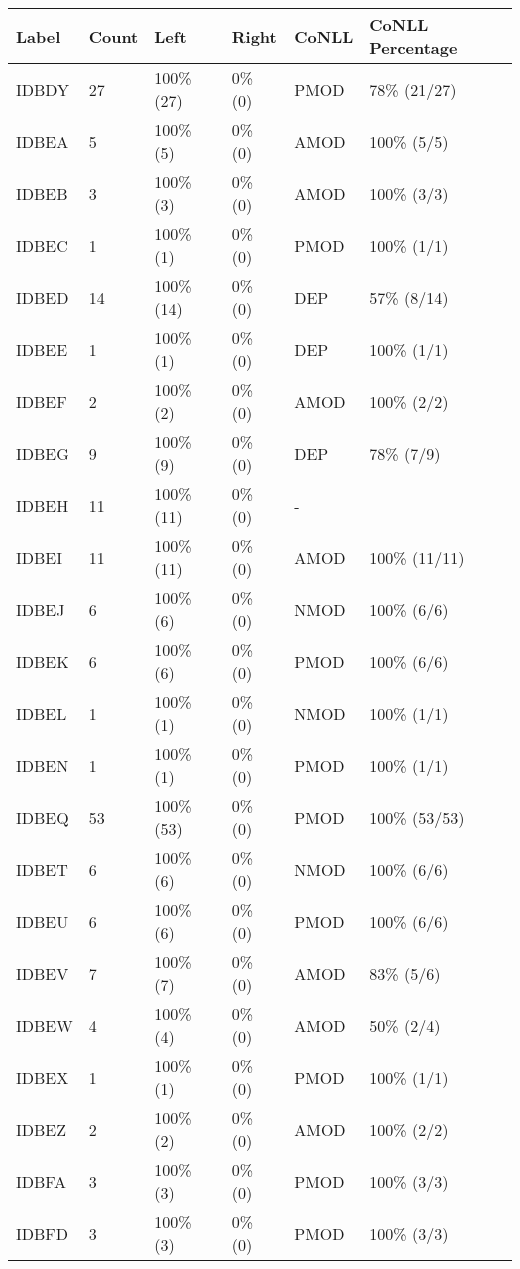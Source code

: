 \begin{figure*}
\begin{tabular}{|l|l|l|l||l|l|}
\hline
Label & Count & Left & Right & CoNLL & CoNLL Percentage\\ 
\hline
 IDBDY & 27 & 100\% (27) & 0\% (0) & PMOD & 78\% (21/27) \\ 
\hline
 IDBEA & 5 & 100\% (5) & 0\% (0) & AMOD & 100\% (5/5) \\ 
\hline
 IDBEB & 3 & 100\% (3) & 0\% (0) & AMOD & 100\% (3/3) \\ 
\hline
 IDBEC & 1 & 100\% (1) & 0\% (0) & PMOD & 100\% (1/1) \\ 
\hline
 IDBED & 14 & 100\% (14) & 0\% (0) & DEP & 57\% (8/14) \\ 
\hline
 IDBEE & 1 & 100\% (1) & 0\% (0) & DEP & 100\% (1/1) \\ 
\hline
 IDBEF & 2 & 100\% (2) & 0\% (0) & AMOD & 100\% (2/2) \\ 
\hline
 IDBEG & 9 & 100\% (9) & 0\% (0) & DEP & 78\% (7/9) \\ 
\hline
 IDBEH & 11 & 100\% (11) & 0\% (0) & - &  \\ 
\hline
 IDBEI & 11 & 100\% (11) & 0\% (0) & AMOD & 100\% (11/11) \\ 
\hline
 IDBEJ & 6 & 100\% (6) & 0\% (0) & NMOD & 100\% (6/6) \\ 
\hline
 IDBEK & 6 & 100\% (6) & 0\% (0) & PMOD & 100\% (6/6) \\ 
\hline
 IDBEL & 1 & 100\% (1) & 0\% (0) & NMOD & 100\% (1/1) \\ 
\hline
 IDBEN & 1 & 100\% (1) & 0\% (0) & PMOD & 100\% (1/1) \\ 
\hline
 IDBEQ & 53 & 100\% (53) & 0\% (0) & PMOD & 100\% (53/53) \\ 
\hline
 IDBET & 6 & 100\% (6) & 0\% (0) & NMOD & 100\% (6/6) \\ 
\hline
 IDBEU & 6 & 100\% (6) & 0\% (0) & PMOD & 100\% (6/6) \\ 
\hline
 IDBEV & 7 & 100\% (7) & 0\% (0) & AMOD & 83\% (5/6) \\ 
\hline
 IDBEW & 4 & 100\% (4) & 0\% (0) & AMOD & 50\% (2/4) \\ 
\hline
 IDBEX & 1 & 100\% (1) & 0\% (0) & PMOD & 100\% (1/1) \\ 
\hline
 IDBEZ & 2 & 100\% (2) & 0\% (0) & AMOD & 100\% (2/2) \\ 
\hline
 IDBFA & 3 & 100\% (3) & 0\% (0) & PMOD & 100\% (3/3) \\ 
\hline
 IDBFD & 3 & 100\% (3) & 0\% (0) & PMOD & 100\% (3/3) \\ 

\end{tabular}
\end{figure*}
